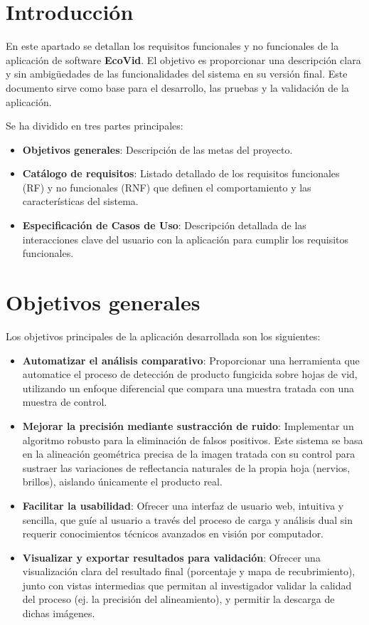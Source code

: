 \label{apendice:requisitos}

\section{Introducción}

En este apartado se detallan los requisitos funcionales y no funcionales de la aplicación de software \textbf{EcoVid}. El objetivo es proporcionar una descripción clara y sin ambigüedades de las funcionalidades del sistema en su versión final. Este documento sirve como base para el desarrollo, las pruebas y la validación de la aplicación.

Se ha dividido en tres partes principales:
\begin{itemize}
    \item \textbf{Objetivos generales}: Descripción de las metas del proyecto.
    \item \textbf{Catálogo de requisitos}: Listado detallado de los requisitos funcionales (RF) y no funcionales (RNF) que definen el comportamiento y las características del sistema.
    \item \textbf{Especificación de Casos de Uso}: Descripción detallada de las interacciones clave del usuario con la aplicación para cumplir los requisitos funcionales.
\end{itemize}

\section{Objetivos generales}

Los objetivos principales de la aplicación desarrollada son los siguientes:
\begin{itemize}
    \item \textbf{Automatizar el análisis comparativo}: Proporcionar una herramienta que automatice el proceso de detección de producto fungicida sobre hojas de vid, utilizando un enfoque diferencial que compara una muestra tratada con una muestra de control.
    \item \textbf{Mejorar la precisión mediante sustracción de ruido}: Implementar un algoritmo robusto para la eliminación de falsos positivos. Este sistema se basa en la alineación geométrica precisa de la imagen tratada con su control para sustraer las variaciones de reflectancia naturales de la propia hoja (nervios, brillos), aislando únicamente el producto real.
    \item \textbf{Facilitar la usabilidad}: Ofrecer una interfaz de usuario web, intuitiva y sencilla, que guíe al usuario a través del proceso de carga y análisis dual sin requerir conocimientos técnicos avanzados en visión por computador.
    \item \textbf{Visualizar y exportar resultados para validación}: Ofrecer una visualización clara del resultado final (porcentaje y mapa de recubrimiento), junto con vistas intermedias que permitan al investigador validar la calidad del proceso (ej. la precisión del alineamiento), y permitir la descarga de dichas imágenes.
\end{itemize}

